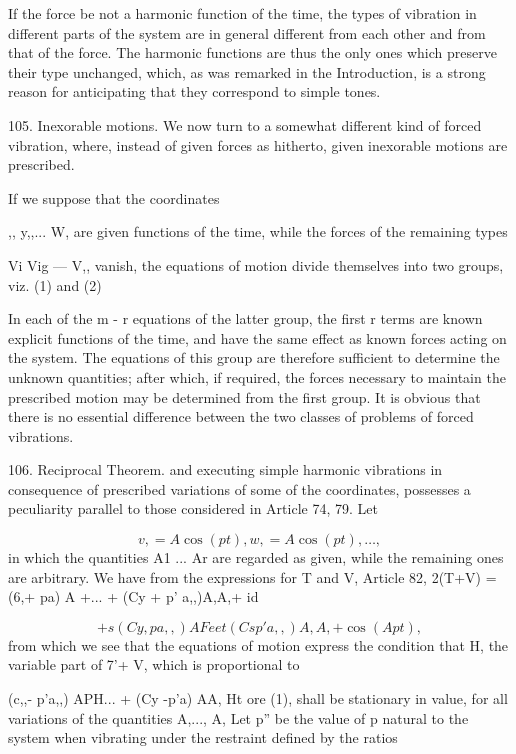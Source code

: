 If the force be not a harmonic function of the time, the types of vibration in
different parts of the system are in general different from each other and from
that of the force. The harmonic functions are thus the only ones which preserve
their type unchanged, which, as was remarked in the Introduction, is a strong
reason for anticipating that they correspond to simple tones.

105.  Inexorable motions.
 We now turn to a somewhat different kind of forced vibration, where,
instead of given forces as hitherto, given inexorable motions are prescribed.

If we suppose that the coordinates

,, y,,... W, are given functions of the time, while the forces of the remaining
types

Vi Vig --- V,, vanish, the equations of motion divide themselves into two
groups, viz.  (1) and (2)

In each of the m - r equations of the latter group, the first r terms are known
explicit functions of the time, and have the same effect as known forces acting
on the system. The equations of this group are therefore sufficient to
determine the unknown quantities; after which, if required, the forces
necessary to maintain the prescribed motion may be determined from the first
group. It is obvious that there is no essential difference between the two
classes of problems of forced vibrations.

106. Reciprocal Theorem. %
and executing simple harmonic vibrations in consequence of prescribed
variations of some of the coordinates, possesses a peculiarity parallel to
those considered in Article 74, 79. Let

\[v,=A \cos(pt), w,=A \cos(pt), \ldots, \]
in which the quantities A1 ... Ar
are regarded as given, while the remaining ones are arbitrary. We have from the
expressions for T and V, Article 82, 2(T+V) =(6,+ pa) A +... + (Cy + p'
a,,)A,A,+ id

\[+ s (Cy,  p a,,) A Feet (Cs  p'a,,) A,A, +  \cos(Apt),\]
from which we see
that the equations of motion express the condition that H, the variable part of
7'+ V, which is proportional to

(c,,- p'a,,) APH... + (Cy -p'a) AA, Ht ore (1), shall be stationary in value,
for all variations of the quantities A,..., A, Let p'' be the value of p
natural to the system when vibrating under the restraint defined by the ratios

